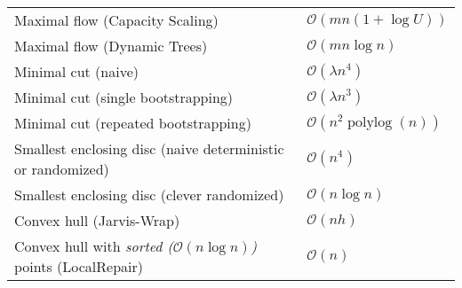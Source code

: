 \documentclass[a4paper,10pt]{article}
\newcommand{\bigO}{\mathcal{O}}
\DeclareMathOperator{\polylog}{polylog}
\begin{document}
\begin{center}
\begin{tabularx}{\textwidth}{Xl}
        Maximal flow (Capacity Scaling) & \(\bigO(mn(1 + \log U))\) \\
        Maximal flow (Dynamic Trees) & \(\bigO(mn\log n)\) \\
        Minimal cut (naive) & \(\bigO(\lambda n^4)\) \\
        Minimal cut (single bootstrapping) & \(\bigO(\lambda n^3)\) \\
        Minimal cut (repeated bootstrapping) & \(\bigO(n^2\polylog(n))\) \\
        Smallest enclosing disc (naive deterministic or randomized) & \(\bigO(n^4)\)\footnotemark[\value{footnote}] \\
        Smallest enclosing disc (clever randomized) & \(\bigO(n \log n)\)\footnotemark[\value{footnote}] \\
        Convex hull (Jarvis-Wrap) & \(\bigO(nh)\) \\
        Convex hull with \emph{sorted ($\bigO(n \log n)$)} points (LocalRepair) & \(\bigO(n)\) \\
        \bottomrule
    \end{tabularx}
    \end{center}
\end{document}

